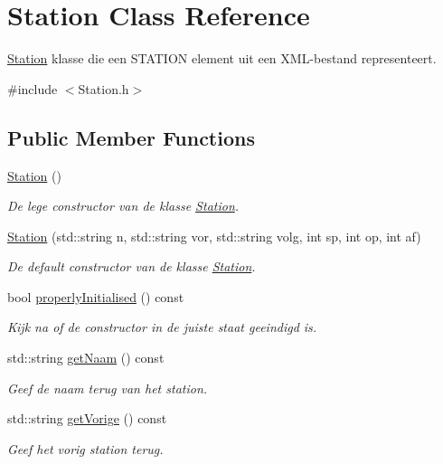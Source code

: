 \hypertarget{class_station}{}\section{Station Class Reference}
\label{class_station}


\hyperlink{class_station}{Station} klasse die een S\+T\+A\+T\+I\+ON element uit een X\+M\+L-\/bestand representeert.  




{\ttfamily \#include $<$Station.\+h$>$}

\subsection*{Public Member Functions}
\begin{DoxyCompactItemize}
\item 
\hyperlink{class_station_a73d335726aad1d844d81cda6d9fd74e6}{Station} ()
\begin{DoxyCompactList}\small\item\em De lege constructor van de klasse \hyperlink{class_station}{Station}. \end{DoxyCompactList}\item 
\hyperlink{class_station_a41fd39388109ad33ea86eb9831ab2f45}{Station} (std\+::string n, std\+::string vor, std\+::string volg, int sp, int op, int af)
\begin{DoxyCompactList}\small\item\em De default constructor van de klasse \hyperlink{class_station}{Station}. \end{DoxyCompactList}\item 
bool \hyperlink{class_station_a5749af84d13b71d34aa1fb5b0a935a20}{properly\+Initialised} () const 
\begin{DoxyCompactList}\small\item\em Kijk na of de constructor in de juiste staat geeindigd is. \end{DoxyCompactList}\item 
std\+::string \hyperlink{class_station_a6d4234bcd1027dc83c7984e207e8bd74}{get\+Naam} () const 
\begin{DoxyCompactList}\small\item\em Geef de naam terug van het station. \end{DoxyCompactList}\item 
std\+::string \hyperlink{class_station_af7516368cf83e9cbadf10309bc8c4aa2}{get\+Vorige} () const 
\begin{DoxyCompactList}\small\item\em Geef het vorig station terug. \end{DoxyCompactList}\item 

\end{DoxyCompactItemize}
